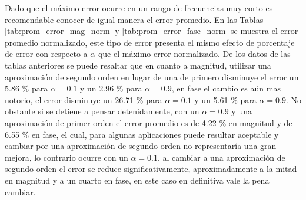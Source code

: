 	Dado que el máximo error ocurre en un rango de frecuencias muy corto es recomendable conocer de igual manera el error promedio. En las Tablas \ref{tab:prom_error_mag_norm} y \ref{tab:prom_error_fase_norm} se muestra el error promedio normalizado, este tipo de error presenta el mismo efecto de porcentaje de error con respecto a $\alpha$ que el máximo error normalizado. De los datos de las tablas anteriores se puede resaltar que en cuanto a magnitud, utilizar una aproximación de segundo orden en lugar de una de primero disminuye el error un 5.86 \% para $\alpha = 0.1$ y un 2.96 \% para $\alpha = 0.9$, en fase el cambio es aún mas notorio, el error disminuye un 26.71 \% para $\alpha = 0.1$ y un 5.61 \% para $\alpha = 0.9$. No obstante si se detiene a pensar detenidamente, con un $\alpha=0.9$ y una aproximación de primer orden el error promedio es de 4.22 \% en magnitud y de 6.55 \% en fase, el cual, para algunas aplicaciones puede resultar aceptable y cambiar por una aproximación de segundo orden no representaría una gran mejora, lo contrario ocurre con un $\alpha=0.1$, al cambiar a una aproximación de segundo orden el error se reduce significativamente, aproximadamente a la mitad en magnitud y a un cuarto en fase, en este caso en definitiva vale la pena cambiar.

